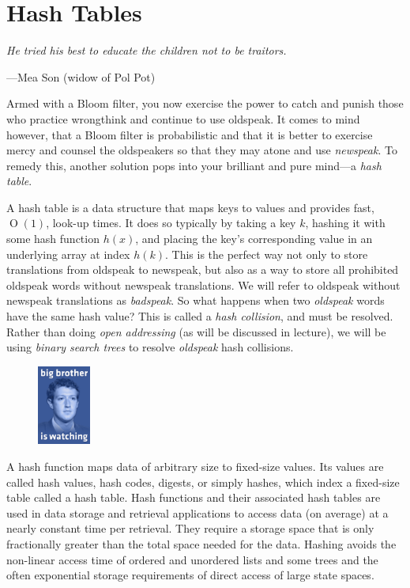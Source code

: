 \section{Hash Tables}\label{hashtable}

\epigraph{\emph{He tried his best to educate the children not to be
traitors.}} {---Mea Son (widow of Pol Pot)}

\noindent Armed with a Bloom filter, you now exercise the power to catch
and punish those who practice wrongthink and continue to use oldspeak.
It comes to mind however, that a Bloom filter is probabilistic and that
it is better to exercise mercy and counsel the oldspeakers so that they
may atone and use \emph{newspeak}. To remedy this, another solution pops
into your brilliant and pure mind---a \emph{hash table}.

A hash table is a data structure that maps keys to values and provides
fast, $\operatorname{O}(1)$, look-up times. It does so typically by
taking a key $k$, hashing it with some hash function $h(x)$, and placing
the key's corresponding value in an underlying array at index $h(k)$.
This is the perfect way not only to store translations from oldspeak to
newspeak, but also as a way to store all prohibited oldspeak words
without newspeak translations. We will refer to oldspeak without
newspeak translations as \emph{badspeak}. So what happens when two
\emph{oldspeak} words have the same hash value?  This is called a
\emph{hash collision}, and must be resolved. Rather than doing
\emph{open addressing} (as will be discussed in lecture), we will be
using \emph{binary search trees} to resolve \emph{oldspeak} hash
collisions.

\begin{figure}
\centering
  \includegraphics[width=0.155\textwidth]{images/facebook-big-brother-is-watching.png}
\end{figure}

A hash function maps data of arbitrary size to fixed-size values. Its
values are called hash values, hash codes, digests, or simply hashes,
which index a fixed-size table called a hash table.  Hash functions and
their associated hash tables are used in data storage and retrieval
applications to access data (on average) at a nearly constant time per
retrieval. They require a storage space that is only fractionally
greater than the total space needed for the data. Hashing avoids the
non-linear access time of ordered and unordered lists and some trees and
the often exponential storage requirements of direct access of large
state spaces.

